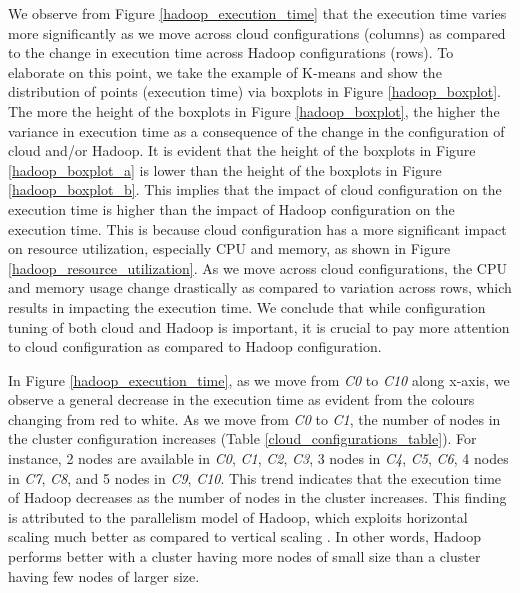 \documentclass[3p]{elsarticle}
\begin{document}
We observe from Figure \ref{hadoop_execution_time} that the execution time varies more significantly as we move across cloud configurations (columns) as compared to the change in execution time across Hadoop configurations (rows). To elaborate on this point, we take the example of K-means and show the distribution of points (execution time) via boxplots in Figure \ref{hadoop_boxplot}. The more the height of the boxplots in Figure \ref{hadoop_boxplot}, the higher the variance in execution time as a consequence of the change in the configuration of cloud and/or Hadoop. It is evident that the height of the boxplots in Figure \ref{hadoop_boxplot_a} is lower than the height of the boxplots in Figure \ref{hadoop_boxplot_b}. This implies that the impact of cloud configuration on the execution time is higher than the impact of Hadoop configuration on the execution time. This is because cloud configuration has a more significant impact on resource utilization, especially CPU and memory, as shown in Figure \ref{hadoop_resource_utilization}. As we move across cloud configurations, the CPU and memory usage change drastically as compared to variation across rows, which results in impacting the execution time. We conclude that while configuration tuning of both cloud and Hadoop is important, it is crucial to pay more attention to cloud configuration as compared to Hadoop configuration. 

In Figure \ref{hadoop_execution_time}, as we move from \textit{C0} to \textit{C10} along x-axis, we observe a general decrease in the execution time as evident from the colours changing from red to white. As we move from \textit{C0} to \textit{C1}, the number of nodes in the cluster configuration increases (Table \ref{cloud_configurations_table}). For instance, 2 nodes are available in \textit{C0}, \textit{C1}, \textit{C2}, \textit{C3}, 3 nodes in \textit{C4}, \textit{C5}, \textit{C6}, 4 nodes in \textit{C7}, \textit{C8}, and 5 nodes in \textit{C9}, \textit{C10}.  This trend indicates that the execution time of Hadoop decreases as the number of nodes in the cluster increases. This finding is attributed to the parallelism model of Hadoop, which exploits horizontal scaling much better as compared to vertical scaling \cite{ullah2022evaluation}. In other words, Hadoop performs better with a cluster having more nodes of small size than a cluster having few nodes of larger size. 
\end{document}
